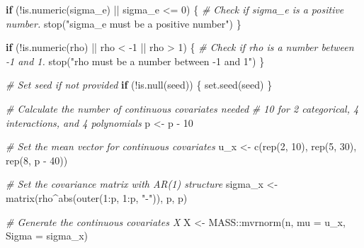 \documentclass[
  11pt,
]{article}
\newenvironment{Shaded}{}{}
\newcommand{\AttributeTok}[1]{\textcolor[rgb]{0.49,0.56,0.16}{#1}}
\newcommand{\CommentTok}[1]{\textcolor[rgb]{0.38,0.63,0.69}{\textit{#1}}}
\newcommand{\ControlFlowTok}[1]{\textcolor[rgb]{0.00,0.44,0.13}{\textbf{#1}}}
\newcommand{\DecValTok}[1]{\textcolor[rgb]{0.25,0.63,0.44}{#1}}
\newcommand{\FunctionTok}[1]{\textcolor[rgb]{0.02,0.16,0.49}{#1}}
\newcommand{\NormalTok}[1]{#1}
\newcommand{\OtherTok}[1]{\textcolor[rgb]{0.00,0.44,0.13}{#1}}
\newcommand{\SpecialCharTok}[1]{\textcolor[rgb]{0.25,0.44,0.63}{#1}}
\newcommand{\StringTok}[1]{\textcolor[rgb]{0.25,0.44,0.63}{#1}}
\begin{document}
\begin{Shaded}
\begin{Highlighting}[]
  \ControlFlowTok{if}\NormalTok{ (}\SpecialCharTok{!}\FunctionTok{is.numeric}\NormalTok{(sigma\_e) }\SpecialCharTok{||}\NormalTok{ sigma\_e }\SpecialCharTok{\textless{}=} \DecValTok{0}\NormalTok{) \{}
    \CommentTok{\# Check if sigma\_e is a positive number.}
    \FunctionTok{stop}\NormalTok{(}\StringTok{"sigma\_e must be a positive number"}\NormalTok{)}
\NormalTok{  \}}
  
  \ControlFlowTok{if}\NormalTok{ (}\SpecialCharTok{!}\FunctionTok{is.numeric}\NormalTok{(rho) }\SpecialCharTok{||}\NormalTok{ rho }\SpecialCharTok{\textless{}} \SpecialCharTok{{-}}\DecValTok{1} \SpecialCharTok{||}\NormalTok{ rho }\SpecialCharTok{\textgreater{}} \DecValTok{1}\NormalTok{) \{}
    \CommentTok{\# Check if rho is a number between {-}1 and 1.}
    \FunctionTok{stop}\NormalTok{(}\StringTok{"rho must be a number between {-}1 and 1"}\NormalTok{)}
\NormalTok{  \}}
  
  \CommentTok{\# Set seed if not provided}
  \ControlFlowTok{if}\NormalTok{ (}\SpecialCharTok{!}\FunctionTok{is.null}\NormalTok{(seed)) \{}
    \FunctionTok{set.seed}\NormalTok{(seed)}
\NormalTok{  \}}
  
  \CommentTok{\# Calculate the number of continuous covariates needed}
  \CommentTok{\# 10 for 2 categorical, 4 interactions, and 4 polynomials}
\NormalTok{  p }\OtherTok{\textless{}{-}}\NormalTok{ p }\SpecialCharTok{{-}} \DecValTok{10}  
  
  \CommentTok{\# Set the mean vector for continuous covariates}
\NormalTok{  u\_x }\OtherTok{\textless{}{-}} \FunctionTok{c}\NormalTok{(}\FunctionTok{rep}\NormalTok{(}\DecValTok{2}\NormalTok{, }\DecValTok{10}\NormalTok{), }\FunctionTok{rep}\NormalTok{(}\DecValTok{5}\NormalTok{, }\DecValTok{30}\NormalTok{), }\FunctionTok{rep}\NormalTok{(}\DecValTok{8}\NormalTok{, p }\SpecialCharTok{{-}} \DecValTok{40}\NormalTok{))}
  
  \CommentTok{\# Set the covariance matrix with AR(1) structure}
\NormalTok{  sigma\_x }\OtherTok{\textless{}{-}} \FunctionTok{matrix}\NormalTok{(rho}\SpecialCharTok{\^{}}\FunctionTok{abs}\NormalTok{(}\FunctionTok{outer}\NormalTok{(}\DecValTok{1}\SpecialCharTok{:}\NormalTok{p, }\DecValTok{1}\SpecialCharTok{:}\NormalTok{p, }\StringTok{"{-}"}\NormalTok{)), p, p)}
  
  \CommentTok{\# Generate the continuous covariates X}
\NormalTok{  X }\OtherTok{\textless{}{-}}\NormalTok{ MASS}\SpecialCharTok{::}\FunctionTok{mvrnorm}\NormalTok{(n, }\AttributeTok{mu =}\NormalTok{ u\_x, }\AttributeTok{Sigma =}\NormalTok{ sigma\_x)}
  

\end{Highlighting}
\end{Shaded}
\end{document}

